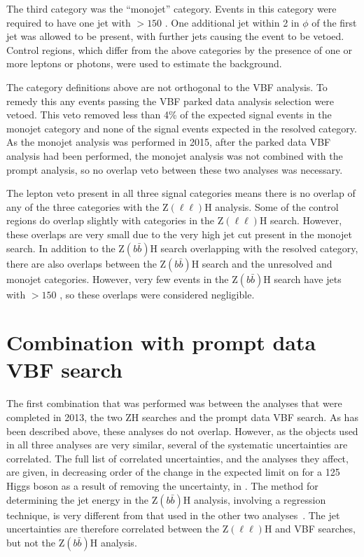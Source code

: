 The third category was the ``monojet'' category. Events in this category were required to have one jet with \pt$>150$ \GeV. One additional jet within 2 in $\phi$ of the first jet was allowed to be present, with further jets causing the event to be vetoed. Control regions, which differ from the above categories by the presence of one or more leptons or photons, were used to estimate the background.

The category definitions above are not orthogonal to the \ac{VBF} analysis. To remedy this any events passing the \ac{VBF} parked data analysis selection were vetoed. This veto removed less than 4\% of the expected signal events in the monojet category and none of the signal events expected in the resolved category. As the monojet analysis was performed in 2015, after the parked data \ac{VBF} analysis had been performed, the monojet analysis was not combined with the prompt analysis, so no overlap veto between these two analyses was necessary.

The lepton veto present in all three signal categories means there is no overlap of any of the three categories with the Z$(\ell\ell)$H analysis. Some of the control regions do overlap slightly with categories in the Z$(\ell\ell)$H search. However, these overlaps are very small due to the very high jet \pt cut present in the monojet search. In addition to the Z$(b\bar{b})$H search overlapping with the resolved category, there are also overlaps between the Z$(b\bar{b})$H search and the  unresolved and monojet categories. However, very few events in the Z$(b\bar{b})$H search have jets with \pt$>150$ \GeV, so these overlaps were considered negligible.

\section{Combination with prompt data VBF search}
\label{sec:combprompt}
The first combination that was performed was between the analyses that were completed in 2013, the two ZH searches and the prompt data \ac{VBF} search. As has been described above, these analyses do not overlap. However, as the objects used in all three analyses are very similar, several of the systematic uncertainties are correlated. The full list of correlated uncertainties, and the analyses they affect, are given, in decreasing order of the change in the expected limit on \BRinv for a 125 \GeV Higgs boson as a result of removing the uncertainty, in . The method for determining the jet energy in the Z$(b\bar{b})$H analysis, involving a regression technique, is very different from that used in the other two analyses~\cite{CMS-PAS-HIG-13-028}. The jet uncertainties are therefore correlated between the Z$(\ell\ell)$H and \ac{VBF} searches, but not the Z$(b\bar{b})$H analysis.

